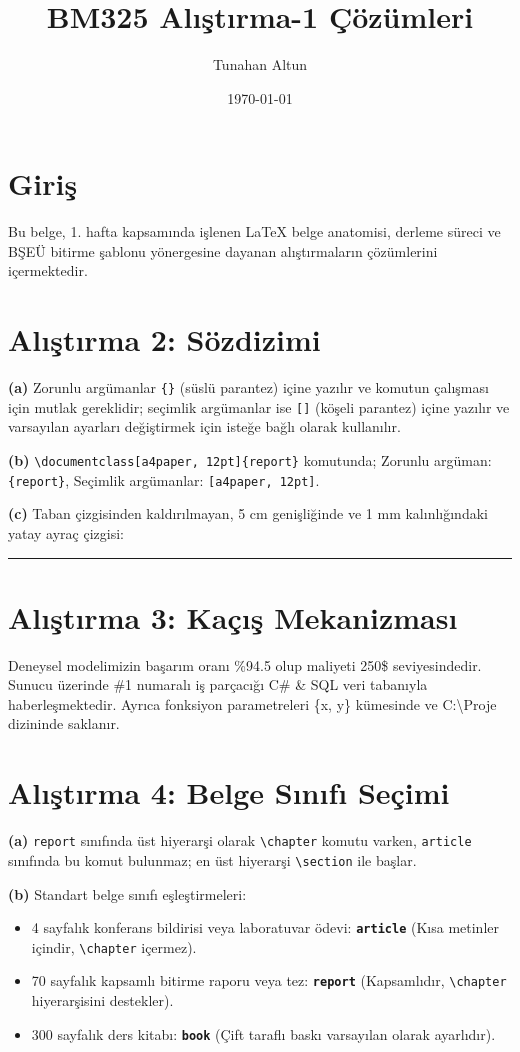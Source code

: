 \documentclass[a4paper, 11pt]{article}
\title{BM325 Alıştırma-1 Çözümleri}
\author{Tunahan Altun}
\date{\today}
\begin{document}
\maketitle

\section{Giriş}
Bu belge, 1. hafta kapsamında işlenen LaTeX belge anatomisi, derleme süreci ve BŞEÜ bitirme şablonu yönergesine dayanan alıştırmaların çözümlerini içermektedir.

\section*{Alıştırma 2: Sözdizimi}
\textbf{(a)} Zorunlu argümanlar \texttt{\{\}} (süslü parantez) içine yazılır ve komutun çalışması için mutlak gereklidir; seçimlik argümanlar ise \texttt{[]} (köşeli parantez) içine yazılır ve varsayılan ayarları değiştirmek için isteğe bağlı olarak kullanılır.

\textbf{(b)} \texttt{\textbackslash documentclass[a4paper, 12pt]\{report\}} komutunda; 
Zorunlu argüman: \texttt{\{report\}}, 
Seçimlik argümanlar: \texttt{[a4paper, 12pt]}.

\textbf{(c)} Taban çizgisinden kaldırılmayan, 5 cm genişliğinde ve 1 mm kalınlığındaki yatay ayraç çizgisi:
\vspace{2mm}
\noindent\rule[0pt]{5cm}{1mm}
\vspace{2mm}

\section*{Alıştırma 3: Kaçış Mekanizması}
Deneysel modelimizin başarım oranı \%94.5 olup maliyeti 250\$ seviyesindedir. Sunucu üzerinde \#1 numaralı iş parçacığı C\# \& SQL veri tabanıyla haberleşmektedir. Ayrıca fonksiyon parametreleri \{x, y\} kümesinde ve C:\textbackslash Proje dizininde saklanır.

\section*{Alıştırma 4: Belge Sınıfı Seçimi}
\textbf{(a)} \texttt{report} sınıfında üst hiyerarşi olarak \texttt{\textbackslash chapter} komutu varken, \texttt{article} sınıfında bu komut bulunmaz; en üst hiyerarşi \texttt{\textbackslash section} ile başlar.

\textbf{(b)} Standart belge sınıfı eşleştirmeleri:
\begin{itemize}
    \item 4 sayfalık konferans bildirisi veya laboratuvar ödevi: \textbf{\texttt{article}} (Kısa metinler içindir, \texttt{\textbackslash chapter} içermez).
    \item 70 sayfalık kapsamlı bitirme raporu veya tez: \textbf{\texttt{report}} (Kapsamlıdır, \texttt{\textbackslash chapter} hiyerarşisini destekler).
    \item 300 sayfalık ders kitabı: \textbf{\texttt{book}} (Çift taraflı baskı varsayılan olarak ayarlıdır).
\end{itemize}
\end{document}
